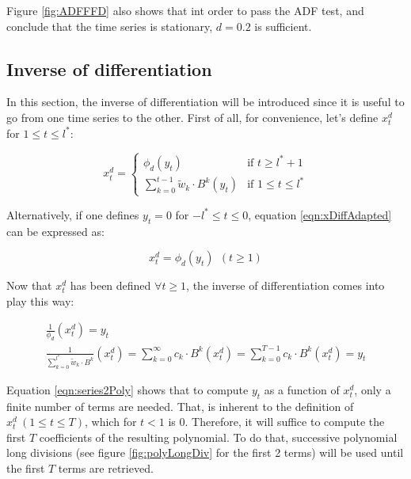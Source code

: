 \documentclass[a4paper]{article}
\begin{document}
Figure \ref{fig:ADFFFD} also shows that int order to pass the ADF test, and 
conclude that the time series is stationary, $d = 0.2$ is sufficient.

\subsection{Inverse of differentiation}
\label{sec:invDiff}
In this section, the inverse of differentiation will be introduced since it 
is useful to go from one time series to the other. First of all, for 
convenience, let's define $x_t^d$ for $1 \leq t \leq l^*$:

\begin{equation}
\label{eqn:xDiffAdapted}
	x_t^d =
	\begin{cases}
		\phi_d (y_t) & \text{if } t \geq l^* + 1\\
		 \sum_{k = 0}^{t - 1} \tilde{w}_k \cdot B^k (y_t) & \text{if } 
		 1 \leq t \leq l^*
	\end{cases}
\end{equation}

Alternatively, if one defines $y_t = 0$ for $-l^* \leq t \leq 0$, equation 
\ref{eqn:xDiffAdapted} can be expressed as:

\begin{equation*}
	x_t^d = \phi_d (y_t) \ \ (t \geq 1)
\end{equation*}

Now that $x_t^d$ has been defined $\forall t \geq 1$, the inverse of 
differentiation comes into play this way:

\begin{align}
	\frac{1}{\phi_d} (x_t^d) = y_t \nonumber \\	
	\frac{1}{\sum_{k = 0}^{l^*} \tilde{w}_k \cdot B^k} (x_t^d) = 
	\sum_{k = 0}^{\infty} c_k \cdot B^k (x_t^d) = \sum_{k = 0}^{T - 1} 
	c_k \cdot B^k (x_t^d) = y_t \label{eqn:series2Poly}
\end{align}

Equation \ref{eqn:series2Poly} shows that to compute $y_t$ as a function of 
$x_t^d$, only a finite number of terms are needed. That, is inherent to the 
definition of $x_t^d \ (1 \leq t \leq T)$, which for $t < 1$ is 0. 
Therefore, it will suffice to compute the first $T$ coefficients of the 
resulting polynomial. To do that, successive polynomial long divisions (see 
figure \ref{fig:polyLongDiv} for the first 2 terms) will be 
used until the first $T$ terms are retrieved.
\end{document}
